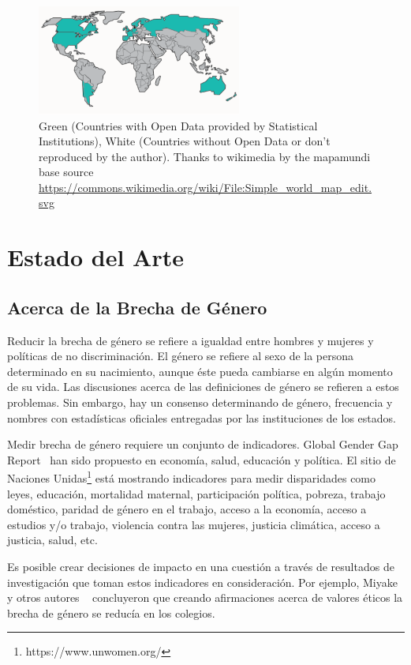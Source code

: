 \documentclass[a4paper]{article}
\begin{document}
\begin{figure}
  \centering
  \includegraphics[width=0.6\textwidth]{images/Simple_world_map_edit.pdf}
  \caption[Caption for LOF]{Green (Countries with Open Data provided by Statistical Institutions), White (Countries without Open Data or don't reproduced by the author). Thanks to wikimedia by the mapamundi base source \url{https://commons.wikimedia.org/wiki/File:Simple_world_map_edit.svg}}
  \label{fig:mapamundi}
\end{figure}

\section{Estado del Arte}
\label{sec:stateofart}

\subsection{Acerca de la Brecha de Género}

Reducir la brecha de género se refiere a igualdad entre hombres y mujeres
y políticas de no discriminación. El género se refiere al sexo de la
persona determinado en su nacimiento, aunque éste pueda cambiarse en
algún momento de su vida. Las discusiones acerca de las definiciones
de género se refieren a estos problemas. Sin embargo, hay un consenso
determinando de género, frecuencia y nombres con estadísticas oficiales
entregadas por las instituciones de los estados.

Medir brecha de género requiere un conjunto de indicadores. Global Gender
Gap Report~\cite{chancel2022world} han sido propuesto en economía, salud,
educación y política. El sitio de Naciones Unidas\footnote{https://www.unwomen.org/}
está mostrando indicadores para medir disparidades como leyes, educación,
mortalidad maternal, participación política, pobreza, trabajo doméstico,
paridad de género en el trabajo, acceso a la economía, acceso a estudios
y/o trabajo, violencia contra las mujeres, justicia climática, acceso a
justicia, salud, etc.

Es posible crear decisiones de impacto en una cuestión a través de resultados
de investigación que toman estos indicadores en consideración. Por ejemplo,
Miyake y otros autores ~\cite{miyake2010reducing} concluyeron que creando
afirmaciones acerca de valores éticos la brecha de género se reducía en
los colegios.
\end{document}
